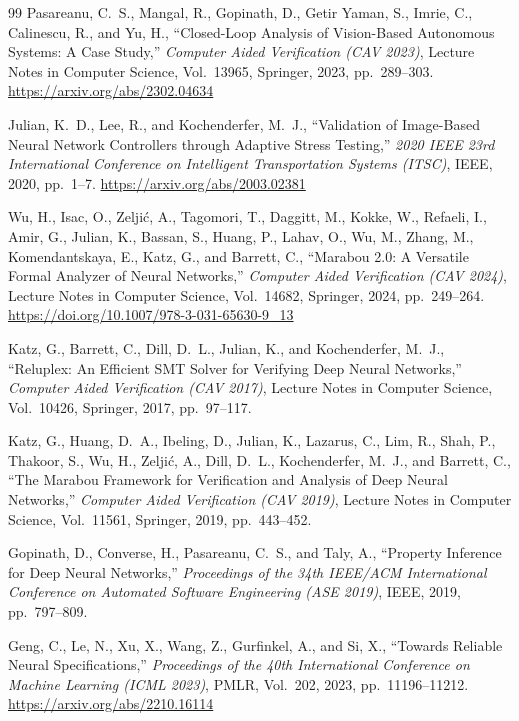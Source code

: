\documentclass[twocolumn,smallextended,runningheads]{svjour3}
\begin{document}
\begin{thebibliography}{99}
Pasareanu, C.~S., Mangal, R., Gopinath, D., Getir Yaman, S., Imrie, C., Calinescu, R., and Yu, H., ``Closed-Loop Analysis of Vision-Based Autonomous Systems: A Case Study,'' \emph{Computer Aided Verification (CAV 2023)}, Lecture Notes in Computer Science, Vol.~13965, Springer, 2023, pp.~289--303. \url{https://arxiv.org/abs/2302.04634}

Julian, K.~D., Lee, R., and Kochenderfer, M.~J., ``Validation of Image-Based Neural Network Controllers through Adaptive Stress Testing,'' \emph{2020 IEEE 23rd International Conference on Intelligent Transportation Systems (ITSC)}, IEEE, 2020, pp.~1--7. \url{https://arxiv.org/abs/2003.02381}

Wu, H., Isac, O., Zelji\'{c}, A., Tagomori, T., Daggitt, M., Kokke, W., Refaeli, I., Amir, G., Julian, K., Bassan, S., Huang, P., Lahav, O., Wu, M., Zhang, M., Komendantskaya, E., Katz, G., and Barrett, C., ``Marabou 2.0: A Versatile Formal Analyzer of Neural Networks,'' \emph{Computer Aided Verification (CAV 2024)}, Lecture Notes in Computer Science, Vol.~14682, Springer, 2024, pp.~249--264. \url{https://doi.org/10.1007/978-3-031-65630-9_13}

Katz, G., Barrett, C., Dill, D.~L., Julian, K., and Kochenderfer, M.~J., ``Reluplex: An Efficient SMT Solver for Verifying Deep Neural Networks,'' \emph{Computer Aided Verification (CAV 2017)}, Lecture Notes in Computer Science, Vol.~10426, Springer, 2017, pp.~97--117.

Katz, G., Huang, D.~A., Ibeling, D., Julian, K., Lazarus, C., Lim, R., Shah, P., Thakoor, S., Wu, H., Zelji\'{c}, A., Dill, D.~L., Kochenderfer, M.~J., and Barrett, C., ``The Marabou Framework for Verification and Analysis of Deep Neural Networks,'' \emph{Computer Aided Verification (CAV 2019)}, Lecture Notes in Computer Science, Vol.~11561, Springer, 2019, pp.~443--452.

Gopinath, D., Converse, H., Pasareanu, C.~S., and Taly, A., ``Property Inference for Deep Neural Networks,'' \emph{Proceedings of the 34th IEEE/ACM International Conference on Automated Software Engineering (ASE 2019)}, IEEE, 2019, pp.~797--809.

Geng, C., Le, N., Xu, X., Wang, Z., Gurfinkel, A., and Si, X., ``Towards Reliable Neural Specifications,'' \emph{Proceedings of the 40th International Conference on Machine Learning (ICML 2023)}, PMLR, Vol.~202, 2023, pp.~11196--11212. \url{https://arxiv.org/abs/2210.16114}


\end{thebibliography}
\end{document}
